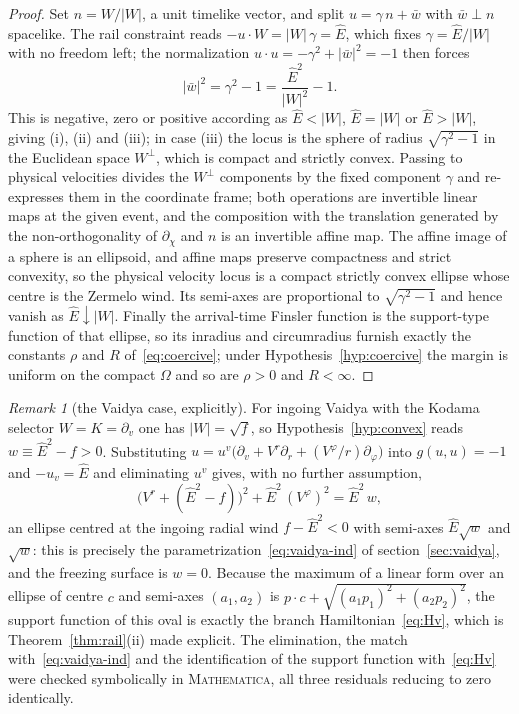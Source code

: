 \documentclass[12pt]{iopart}
\newcommand{\Ehat}{\hat E}
\theoremstyle{plain}
\theoremstyle{definition}
\theoremstyle{plain}
\theoremstyle{remark}
\newtheorem*{remark}{Remark}
\begin{document}
\begin{proof}
Set $n=W/|W|$, a unit timelike vector, and split $u=\gamma\,n+\bar w$ with
$\bar w\perp n$ spacelike. The rail constraint reads $-u\cdot W=|W|\,\gamma=\Ehat$, which
fixes $\gamma=\Ehat/|W|$ with no freedom left; the normalization
$u\cdot u=-\gamma^2+|\bar w|^2=-1$ then forces
\[
   |\bar w|^{2}=\gamma^{2}-1=\frac{\Ehat^{2}}{|W|^{2}}-1 .
\]
This is negative, zero or positive according as $\Ehat<|W|$, $\Ehat=|W|$ or $\Ehat>|W|$,
giving (i), (ii) and (iii); in case (iii) the locus is the sphere of radius
$\sqrt{\gamma^2-1}$ in the Euclidean space $W^\perp$, which is compact and strictly convex.
Passing to physical velocities divides the $W^\perp$ components by the fixed component
$\gamma$ and re-expresses them in the coordinate frame; both operations are invertible
linear maps at the given event, and the composition with the translation generated by the
non-orthogonality of $\partial_\chi$ and $n$ is an invertible affine map. The affine image
of a sphere is an ellipsoid, and affine maps preserve compactness and strict convexity, so
the physical velocity locus is a compact strictly convex ellipse whose centre is the
Zermelo wind. Its semi-axes are proportional to $\sqrt{\gamma^2-1}$ and hence vanish as
$\Ehat\downarrow|W|$. Finally the arrival-time Finsler function is the support-type
function of that ellipse, so its inradius and circumradius furnish exactly the constants
$\rho$ and $R$ of~\eqref{eq:coercive}; under Hypothesis~\ref{hyp:coercive} the margin is
uniform on the compact $\Omega$ and so are $\rho>0$ and $R<\infty$.
\end{proof}

\begin{remark}[the Vaidya case, explicitly]\label{rem:vaidya-indicatrix}
For ingoing Vaidya with the Kodama selector $W=K=\partial_v$ one has $|W|=\sqrt f$, so
Hypothesis~\ref{hyp:convex} reads $w\equiv\Ehat^2-f>0$. Substituting
$u=u^v\big(\partial_v+V^r\partial_r+(V^\varphi/r)\partial_\varphi\big)$ into
$g(u,u)=-1$ and $-u_v=\Ehat$ and eliminating $u^v$ gives, with no further assumption,
\[
   \big(V^r+(\Ehat^2-f)\big)^2+\Ehat^2\,(V^\varphi)^2=\Ehat^2\,w ,
\]
an ellipse centred at the ingoing radial wind $f-\Ehat^2<0$ with semi-axes $\Ehat\sqrt w$
and $\sqrt w$: this is precisely the parametrization~\eqref{eq:vaidya-ind} of
section~\ref{sec:vaidya}, and the freezing surface is $w=0$. Because the maximum of a
linear form over an ellipse of centre $c$ and semi-axes $(a_1,a_2)$ is
$p\cdot c+\sqrt{(a_1p_1)^2+(a_2p_2)^2}$, the support function of this oval is exactly the
branch Hamiltonian~\eqref{eq:Hv}, which is Theorem~\ref{thm:rail}(ii) made explicit. The
elimination, the match with~\eqref{eq:vaidya-ind} and the identification of the support
function with~\eqref{eq:Hv} were checked symbolically in \textsc{Mathematica}, all three
residuals reducing to zero identically.
\end{remark}
\end{document}
